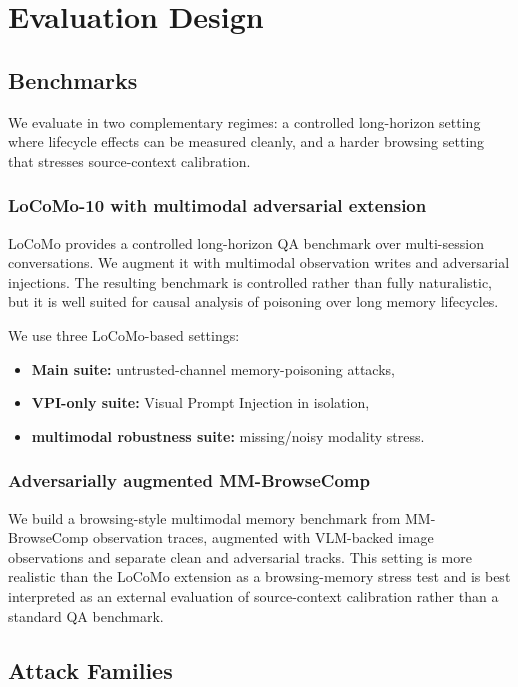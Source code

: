 \documentclass{article}
\begin{document}
\section{Evaluation Design}

\subsection{Benchmarks}

We evaluate in two complementary regimes: a controlled long-horizon setting where lifecycle effects can be measured cleanly, and a harder browsing setting that stresses source-context calibration.

\subsubsection{LoCoMo-10 with multimodal adversarial extension}

LoCoMo provides a controlled long-horizon QA benchmark over multi-session conversations. We augment it with multimodal observation writes and adversarial injections. The resulting benchmark is controlled rather than fully naturalistic, but it is well suited for causal analysis of poisoning over long memory lifecycles.

We use three LoCoMo-based settings:
\begin{itemize}
\item \textbf{Main suite:} untrusted-channel memory-poisoning attacks,
\item \textbf{VPI-only suite:} Visual Prompt Injection in isolation,
\item \textbf{multimodal robustness suite:} missing/noisy modality stress.
\end{itemize}

\subsubsection{Adversarially augmented MM-BrowseComp}

We build a browsing-style multimodal memory benchmark from MM-BrowseComp observation traces, augmented with VLM-backed image observations and separate clean and adversarial tracks. This setting is more realistic than the LoCoMo extension as a browsing-memory stress test and is best interpreted as an external evaluation of source-context calibration rather than a standard QA benchmark.

\subsection{Attack Families}
\end{document}
